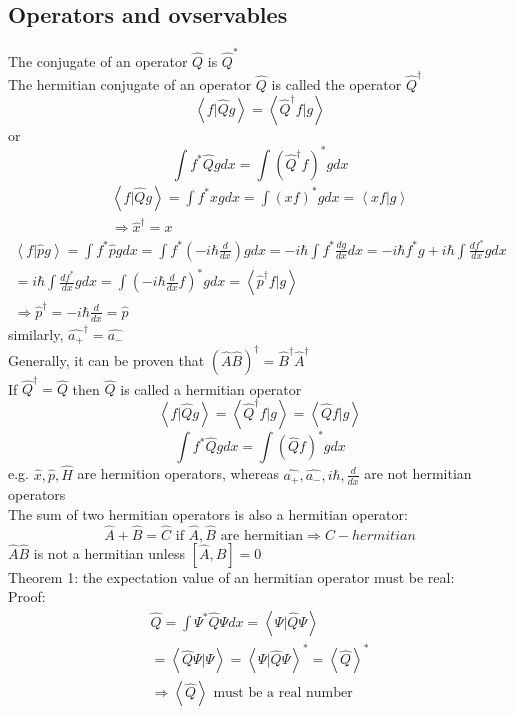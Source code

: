 \documentclass[12pt, a4paper]{article}
\begin{document}
\section{}
\subsection{Operators and ovservables}
The conjugate of an operator $\hat{Q}$ is $\hat{Q}^*$\\
The hermitian conjugate of an operator $\hat{Q}$ is called the operator $\hat{Q}^{\dagger}$
$$\left<f|\hat{Q}g\right>=\left<\hat{Q}^{\dagger}f|g\right>$$
or
$$\int f^* \hat{Q}gdx=\int (\hat{Q}^{\dagger}f)^*gdx$$
\begin{align*}
\left<f|\hat{Q}g\right>=\int f^*xgdx=\int (xf)^*gdx=\left<xf|g\right>\\
\Rightarrow \hat{x}^{\dagger}=x
\end{align*}
\begin{align*}
\left<f|\hat{p}g\right>=\int f^*\hat{p}gdx=\int f^*(-i\hbar\frac{d}{dx})gdx=-i\hbar\int f^*\frac{dg}{dx}dx=-i\hbar f^*g+i\hbar\int \frac{df^*}{dx}gdx\\
=i\hbar \int \frac{df^*}{dx}gdx=\int (-i\hbar \frac{d}{dx}f)^*gdx=\left<\hat{p}^{\dagger}f|g\right>\\
\Rightarrow\hat{p}^{\dagger}=-i\hbar \frac{d}{dx}=\hat{p}
\end{align*}
similarly, $\hat{a_+}^{\dagger}=\hat{a_-}$\\
Generally, it can be proven that $(\hat{A}\hat{B})^{\dagger}=\hat{B}^{\dagger}\hat{A}^{\dagger}$\\
If $\hat{Q}^{\dagger}=\hat{Q}$ then $\hat{Q}$ is called a hermitian operator\\
$$\left<f|\hat{Q}g\right>=\left<\hat{Q}^{\dagger}f|g\right>=\left<\hat{Q}f|g\right>$$
$$\int f^*\hat{Q}gdx=\int (\hat{Q}f)^*gdx$$
e.g. $\hat{x},\hat{p},\hat{H}$ are hermition operators, whereas $\hat{a_+},\hat{a_-},i\hbar,\frac{d}{dx}$ are not hermitian operators\\
The sum of two hermitian operators is also a hermitian operator:
$$\hat{A}+\hat{B}=\hat{C}\text{ if }\hat{A},\hat{B}\text{ are hermitian} \Rightarrow C-hermitian$$
$\hat{A}\hat{B}$ is not a hermitian unless $[\hat{A},\hat{B}]=0$\\
Theorem 1: the expectation value of an hermitian operator must be real:\\
Proof: \begin{align*}
\hat{Q}=\int \Psi^*\hat{Q}\Psi dx=\left<\Psi|\hat{Q}\Psi\right>\\
=\left<\hat{Q}\Psi|\Psi\right>=\left<\Psi|\hat{Q}\Psi\right>^*=\left<\hat{Q}\right>^*\\
\Rightarrow \left<\hat{Q}\right> \text{ must be a real number}
\end{align*}
\end{document}
